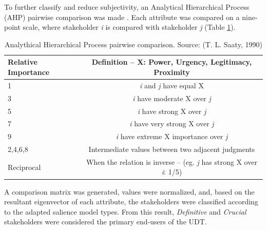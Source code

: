 \documentclass[authoryear,preprint,review,doubleblind, 12pt]{elsarticle}
\begin{document}
    To further classify and reduce subjectivity, an Analytical Hierarchical Process (AHP) pairwise comparison was made \citep{Saaty1987, Saaty1990}. Each attribute was compared on a nine-point scale, where stakeholder \textit{i} is compared with stakeholder \textit{j} (Table \ref{tab:Saaty}).
    
    \begin{table}[h!]
        \centering
        \caption{Analythical Hierarchical Process pairwise comparison. Source: (T. L. Saaty, 1990)}
        \small
        \label{tab:Saaty}
        \begin{tabularx}{\linewidth}{X c}
            \toprule
            Relative Importance&Definition – X: Power, Urgency, Legitimacy, Proximity\\
            \midrule
            1&\textit{i} and \textit{j} have equal X\\
            3&\textit{i} have moderate X over \textit{j}\\
            5&\textit{i} have strong X over \textit{j}\\
            7&\textit{i} have very strong X over \textit{j}\\
            9&\textit{i} have extreme X importance over \textit{j}\\
            2,4,6,8&Intermediate values between two adjacent judgments\\
            Reciprocal&When the relation is inverse –
            (eg. \textit{j} has strong X over \textit{i}: 1/5)\\
            \bottomrule        
        \end{tabularx}
    \end{table}
    
    A comparison matrix was generated, values were normalized, and, based on the resultant eigenvector of each attribute, the stakeholders were classified according to the adapted salience model types. From this result, \textit{Definitive} and \textit{Crucial} stakeholders were considered the primary end-users of the UDT.
\end{document}
